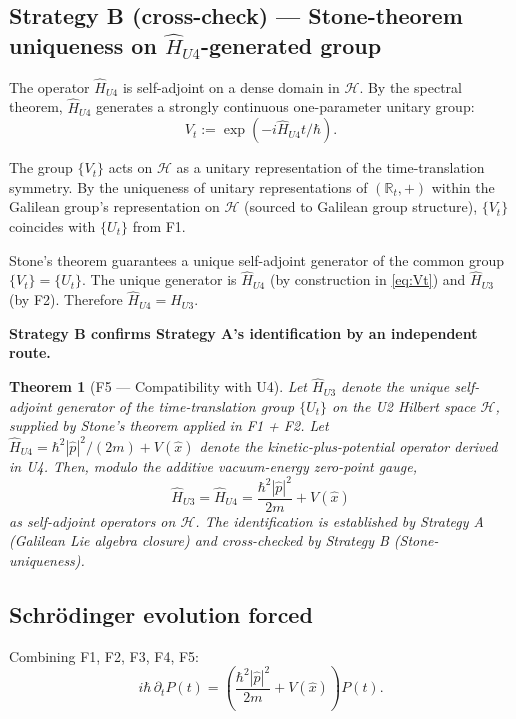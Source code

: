 \documentclass[11pt,a4paper]{article}
\newtheorem{theorem}{Theorem}[section]
\begin{document}
\subsection{Strategy B (cross-check) --- Stone-theorem uniqueness on $\hat{H}_{U4}$-generated group}

The operator $\hat{H}_{U4}$ is self-adjoint on a dense domain in $\mathcal{H}$. By the spectral theorem, $\hat{H}_{U4}$ generates a strongly continuous one-parameter unitary group:
\begin{equation}
V_t := \exp(-i\hat{H}_{U4} t/\hbar). \label{eq:Vt}
\end{equation}

The group $\{V_t\}$ acts on $\mathcal{H}$ as a unitary representation of the time-translation symmetry. By the uniqueness of unitary representations of $(\mathbb{R}_t, +)$ within the Galilean group's representation on $\mathcal{H}$ (sourced to Galilean group structure), $\{V_t\}$ coincides with $\{U_t\}$ from F1.

Stone's theorem guarantees a unique self-adjoint generator of the common group $\{V_t\} = \{U_t\}$. The unique generator is $\hat{H}_{U4}$ (by construction in \eqref{eq:Vt}) and $\hat{H}_{U3}$ (by F2). Therefore $\hat{H}_{U4} = \hat{H}_{U3}$.

\textbf{Strategy B confirms Strategy A's identification by an independent route.}

\begin{theorem}[F5 --- Compatibility with U4]
Let $\hat{H}_{U3}$ denote the unique self-adjoint generator of the time-translation group $\{U_t\}$ on the U2 Hilbert space $\mathcal{H}$, supplied by Stone's theorem applied in F1 + F2. Let $\hat{H}_{U4} = \hbar^2 |\hat{p}|^2/(2m) + V(\hat{x})$ denote the kinetic-plus-potential operator derived in U4. Then, modulo the additive vacuum-energy zero-point gauge,
\[
\hat{H}_{U3} = \hat{H}_{U4} = \frac{\hbar^2 |\hat{p}|^2}{2m} + V(\hat{x})
\]
as self-adjoint operators on $\mathcal{H}$. The identification is established by Strategy A (Galilean Lie algebra closure) and cross-checked by Strategy B (Stone-uniqueness).
\end{theorem}

\subsection{Schr\"odinger evolution forced}

Combining F1, F2, F3, F4, F5:
\begin{equation}
\boxed{i\hbar \, \partial_t P(t) = \left( \frac{\hbar^2 |\hat{p}|^2}{2m} + V(\hat{x}) \right) P(t).} \label{eq:Schroedinger}
\end{equation}
\end{document}
